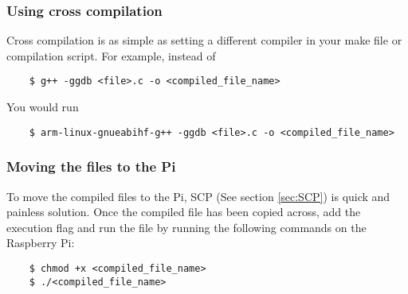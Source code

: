 \subsubsection{Using cross compilation}
Cross compilation is as simple as setting a different compiler in your make file or compilation script.
For example, instead of 
\begin{verbatim}
    $ g++ -ggdb <file>.c -o <compiled_file_name>
\end{verbatim}
You would run
\begin{verbatim}
    $ arm-linux-gnueabihf-g++ -ggdb <file>.c -o <compiled_file_name>
\end{verbatim}

\subsubsection{Moving the files to the Pi}
To move the compiled files to the Pi, SCP (See section \ref{sec:SCP}) is quick and painless solution. 
Once the compiled file has been copied across, add the execution flag and run the file by running the following commands on the Raspberry Pi:
\begin{verbatim}
    $ chmod +x <compiled_file_name>
    $ ./<compiled_file_name>
\end{verbatim}
